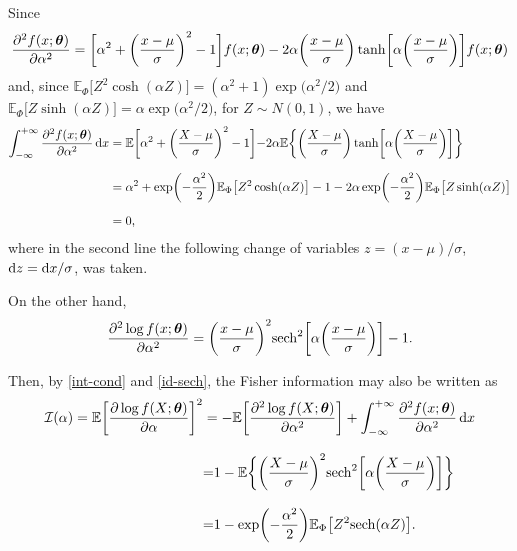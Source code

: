 \documentclass[12pt]{article}
\theoremstyle{definition}
\begin{document}
Since 
\begin{align*}
{\partial^2 f(x;\boldsymbol{\theta})\over \partial \alpha^2}
=
\biggl[\alpha^2+
\biggl({x-\mu\over \sigma}\biggr)^2-1\biggl]
f(x;\boldsymbol{\theta})
-
2\alpha \biggl({x-\mu\over \sigma}\biggr)
\tanh\biggl[\alpha\biggl({x-\mu\over \sigma}\biggr)\biggr]
f(x;\boldsymbol{\theta}) 
\end{align*}
and, since $
\mathbb{E}_{\Phi}\big[Z^2 \cosh(\alpha Z) \big]=(\alpha^2+1)\exp\big({\alpha^2/ 2}\big)$ and $\mathbb{E}_{\Phi}
\big[Z\sinh(\alpha Z)\big]=\alpha\exp\big({\alpha^2/ 2}\big)$,
for $Z\sim N(0,1)$, we have
\begin{align}\label{int-cond}
\int_{-\infty}^{+\infty} {\partial^2 f(x;\boldsymbol{\theta})\over \partial \alpha^2}\, {\rm d}x
&=
\mathbb{E}\biggl[\alpha^2+
\biggl({ X-\mu\over \sigma}\biggr)^2-1\biggl]
-
2\alpha
\mathbb{E}
\biggl\{\biggl({ X-\mu\over \sigma}\biggr)
\tanh\biggl[\alpha\biggl({ X-\mu\over \sigma}\biggr)\biggr]\biggr\}
\nonumber
\\[0,25cm]
&=
\alpha^2+
\exp\biggl(-{\alpha^2\over 2}\biggr)
\mathbb{E}_{\Phi}\big[Z^2 \cosh(\alpha Z)\big]
-1
-
2\alpha 
\exp\biggl(-{\alpha^2\over 2}\biggr)
\mathbb{E}_{\Phi}
\big[Z\sinh(\alpha Z)\big]
\nonumber
\\[0,2cm]
&=
0,
\end{align}
where in the second line the following change of variables $z=(x-\mu)/\sigma$, ${\rm d}z={\rm d}x/\sigma$, was taken.

On the other hand, 
\begin{align}\label{id-sech}
{\partial^2 \log f(x;\boldsymbol{\theta})\over \partial \alpha^2 }
=
\biggl({x-\mu\over \sigma}\biggr)^2
{\rm sech}^2\biggl[\alpha\biggl({x-\mu\over \sigma}\biggr)\biggr] -1 .
\end{align}

Then, by \eqref{int-cond} and \eqref{id-sech},
the Fisher information may also be written as
\begin{align}\label{IF}
\mathcal{I}(\alpha)
=
\mathbb{E}\biggl[{\partial \log f(X;\boldsymbol{\theta})\over \partial \alpha }\biggr]^2 \nonumber
&=
-\mathbb{E}\biggl[{\partial^2 \log f(X;\boldsymbol{\theta})\over \partial \alpha^2 }\biggr]
+
\int_{-\infty}^{+\infty} {\partial^2 f(x;\boldsymbol{\theta})\over \partial \alpha^2}\, {\rm d}x \nonumber
\\[0,3cm]
&{=}
1- \mathbb{E}\biggl\{\biggl({X-\mu\over \sigma}\biggr)^2
{\rm sech}^2\biggl[\alpha\biggl({X-\mu\over \sigma}\biggr)\biggr]\biggl\} \nonumber
\\[0,3cm]
&{=}
1-\exp\biggl(-{\alpha^2\over 2}\biggr)\mathbb{E}_{\Phi}
\big[Z^2{\rm sech}(\alpha Z)\big].
\end{align}
\end{document}
